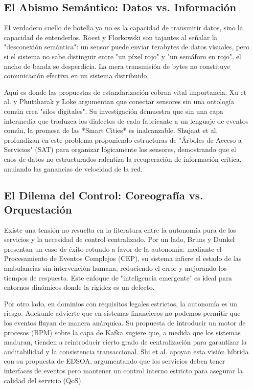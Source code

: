 \subsection{El Abismo Semántico: Datos vs. Información}
El verdadero cuello de botella ya no es la capacidad de transmitir datos, sino la capacidad de entenderlos. Roest y Florkowski \cite{roest2017challenges} son tajantes al señalar la "desconexión semántica": un sensor puede enviar terabytes de datos visuales, pero si el sistema no sabe distinguir entre "un píxel rojo" y "un semáforo en rojo", el ancho de banda se desperdicia. La mera transmisión de bytes no constituye comunicación efectiva en un sistema distribuido.

Aquí es donde las propuestas de estandarización cobran vital importancia. Xu et al. \cite{xu2016provisioning} y Phuttharak y Loke \cite{phuttharak2023smartcity} argumentan que conectar sensores sin una ontología común crea "silos digitales". Su investigación demuestra que sin una capa intermedia que traduzca los dialectos de cada fabricante a un lenguaje de eventos común, la promesa de las *Smart Cities* es inalcanzable. Shujaat et al. \cite{shujaat2021improvements} profundizan en este problema proponiendo estructuras de "Árboles de Acceso a Servicios" (SAT) para organizar lógicamente los sensores, demostrando que el caos de datos no estructurados ralentiza la recuperación de información crítica, anulando las ganancias de velocidad de la red.

\subsection{El Dilema del Control: Coreografía vs. Orquestación}
Existe una tensión no resuelta en la literatura entre la autonomía pura de los servicios y la necesidad de control centralizado.
Por un lado, Bruns y Dunkel \cite{bruns2014fusion} presentan un caso de éxito rotundo a favor de la autonomía: mediante el Procesamiento de Eventos Complejos (CEP), su sistema infiere el estado de las ambulancias sin intervención humana, reduciendo el error y mejorando los tiempos de respuesta. Este enfoque de "inteligencia emergente" es ideal para entornos dinámicos donde la rigidez es un defecto.

Por otro lado, en dominios con requisitos legales estrictos, la autonomía es un riesgo. Adekunle \cite{adekunle2024financial} advierte que en sistemas financieros no podemos permitir que los eventos fluyan de manera anárquica. Su propuesta de introducir un motor de procesos (BPM) sobre la capa de Kafka sugiere que, a medida que los sistemas maduran, tienden a reintroducir cierto grado de centralización para garantizar la auditabilidad y la consistencia transaccional. Shi et al. \cite{shi2015execution} apoyan esta visión híbrida con su propuesta de EDSOA, argumentando que los servicios deben tener interfaces de eventos pero mantener un control interno estricto para asegurar la calidad del servicio (QoS).

